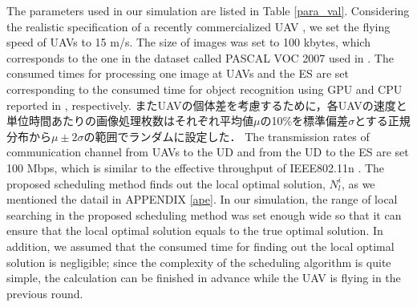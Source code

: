 \documentclass{ieeeaccess}
\begin{document}
The parameters used in our simulation are listed in Table \ref{para_val}.
%
Considering the realistic specification of a recently commercialized UAV \cite{bebop2}, we set the flying speed of UAVs to 15 m/s.
%
The size of images was set to 100 kbytes, which corresponds to the one in the dataset called PASCAL VOC 2007 used in \cite{Ren2015}.
%
The consumed times for processing one image at UAVs and the ES are set corresponding to the consumed time for object recognition using GPU and CPU reported in \cite{Ren2015}, respectively.
%
またUAVの個体差を考慮するために，各UAVの速度と単位時間あたりの画像処理枚数はそれぞれ平均値$\mu$の10\%を標準偏差$\sigma$とする正規分布から$\mu{\pm}2{\sigma}$の範囲でランダムに設定した．
%
The transmission rates of communication channel from UAVs to the UD and from the UD to the ES are set 100 Mbps, which is similar to the effective throughput of IEEE802.11n \cite{Li2013}.
%
The proposed scheduling method finds out the local optimal solution, $N_{l}^i$, as we mentioned the datail in APPENDIX \ref{ape}.
In our simulation, the range of local searching in the proposed scheduling method was set enough wide so that it can ensure that the local optimal solution equals to the true optimal solution.
%
In addition, we assumed that the consumed time for finding out the local optimal solution is negligible; since the complexity of the scheduling algorithm is quite simple, the calculation can be finished in advance while the UAV is flying in the previous round.
\end{document}
